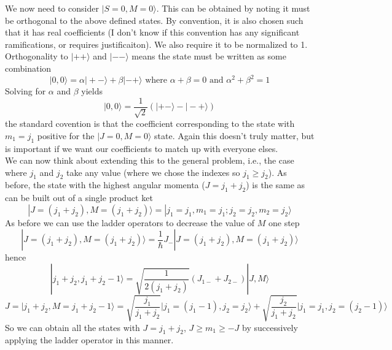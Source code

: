 \documentclass[12pt]{article}
\begin{document}
\noindent We now need to consider $|S=0, M=0\rangle$. This can be obtained by noting 
it must be orthogonal to the above defined states. By convention, it is also chosen such that it
has real coefficients (I don't know if this convention has any significant ramifications, or requires justificaiton).
We also require it to be normalized to 1. Orthogonality to $|++\rangle$ and $|--\rangle$ means
the state must be written as some combination
\begin{equation}
|0,0\rangle = \alpha | +-\rangle +\beta| -+\rangle
 \text{\ \ \ where \ \ } \alpha+\beta =0
 \text{ \ \ \ and \ \ \ } \alpha^{2}+\beta^{2} = 1
\end{equation}
Solving for $\alpha$ and $\beta$ yields
\begin{equation}
|0,0\rangle = \frac{1}{\sqrt{2}} (|+-\rangle - | -+\rangle )
\end{equation}
the standard covention is that the coefficient corresponding to the state with
$m_{1} = j_{1}$ positive for the $|J=0, M=0\rangle$ state. Again this doesn't 
truly matter, but is important if we want our coefficients to match up 
with everyone elses.\\

\noindent We can now think about extending this to the general problem, i.e., the case
where $j_{1}$ and $j_{2}$ take any value (where we chose the indexes so $j_{1} \geq j_{2}$). 
As before, the state with the highest angular momenta ($J=j_{1}+j_{2}$) is the same as
can be built out of a single product ket 
\begin{equation}
|J= (j_{1}+j_{2}), M=(j_{1}+j_{2})\rangle = | j_{1} =j_{1}, m_{1}=j_{1}; j_{2}=j_{2},m_{2}=j_{2} \rangle 
\end{equation}
\noindent  As before we can use the ladder operators to decrease the value of $M$ one step
\begin{equation}
|J= (j_{1}+j_{2}), M=(j_{1}+j_{2})\rangle =
\frac{1}{\hbar}J_{-}|J= (j_{1}+j_{2}), M=(j_{1}+j_{2})\rangle 
\end{equation}
\noindent hence
\begin{equation*}
| j_{1}+j_{2}, j_{1}+j_{2}-1\rangle
=\sqrt{\frac{1}{2(j_{1}+j_{2})}}(J_{1-}+J_{2-})|J,M\rangle
\end{equation*}
\begin{equation*}
J=| j_{1}+j_{2},M= j_{1}+j_{2}-1\rangle
=\sqrt{\frac{j_{1}}{j_{1}+j_{2}}}  \Bigg|j_{1}= (j_{1}-1) ,j_{2}=j_{2}\Bigg\rangle+
 \sqrt{\frac{j_{2}}{j_{1}+j_{2}}}  \Bigg|j_{1}= j_{1}   ,j_{2}=(j_{2}-1)\Bigg\rangle
\end{equation*}
So we can obtain all the states with $J=j_{1}+j_{2}$, $J \geq  m_{1} \geq -J $ by successively applying the ladder operator
in this manner.\\
\end{document}
